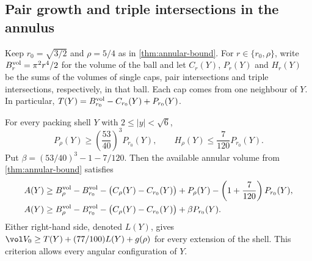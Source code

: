 \subsection{Pair growth and triple intersections in the annulus}
\label{sec:annular-cap-comparison}

Keep \(r_0=\sqrt{3/2}\) and \(\rho=5/4\) as in
\cref{thm:annular-bound}. For \(r\in\{r_0,\rho\}\), write
\(B_r^{\rm vol}=\pi^2r^4/2\) for the volume of the ball and
let \(C_r(Y)\), \(P_r(Y)\) and \(H_r(Y)\) be the sums of the
volumes of single caps, pair intersections and triple
intersections, respectively, in that ball. Each cap comes
from one neighbour of \(Y\). In particular,
\(T(Y)=B_{r_0}^{\rm vol}-C_{r_0}(Y)+P_{r_0}(Y)\).

\begin{thm}
\label{thm:annular-cap-comparison}
For every packing shell \(Y\) with \(2\le |y|<\sqrt6\),
\[
 P_\rho(Y)\ge \left(\frac{53}{40}\right)^3 P_{r_0}(Y),
 \qquad H_\rho(Y)\le\frac7{120}P_{r_0}(Y).
\]
Put \(\beta=(53/40)^3-1-7/120\). Then the available annular
volume from \cref{thm:annular-bound} satisfies
\begin{align}
 A(Y)&\ge B_\rho^{\rm vol}-B_{r_0}^{\rm vol}
  -\bigl(C_\rho(Y)-C_{r_0}(Y)\bigr)
  +P_\rho(Y)-\left(1+\frac7{120}\right)P_{r_0}(Y),
  \label{eq:annular-cap-exact-pairs}\\
 A(Y)&\ge B_\rho^{\rm vol}-B_{r_0}^{\rm vol}
  -\bigl(C_\rho(Y)-C_{r_0}(Y)\bigr)+\beta P_{r_0}(Y).
  \label{eq:annular-cap-one-pair}
\end{align}
Either right-hand side, denoted \(L(Y)\), gives
\(\vol V_0\ge T(Y)+(77/100)L(Y)+g(\rho)\) for every extension
of the shell. This criterion allows every angular configuration
of \(Y\).
\end{thm}

